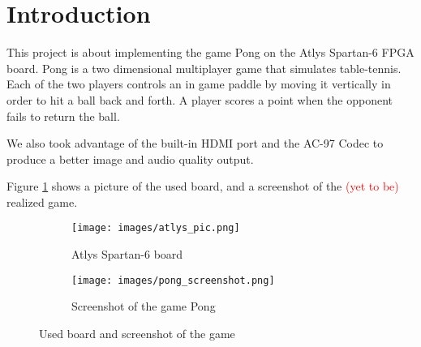 
\section{Introduction}
	This project is about implementing the game Pong on the Atlys Spartan-6 FPGA board. Pong is a two dimensional multiplayer game that simulates table-tennis. Each of the two players controls an in game paddle by moving it vertically in order to hit a ball back and forth. A player scores a point when the opponent fails to return the ball. 
	
	We also took advantage of the built-in HDMI port and the AC-97 Codec to produce a better image and audio quality output. 
	
	Figure \ref{board+screenshot} shows a picture of the used board, and a screenshot of the \textcolor{red}{(yet to be)} realized game. 
	
	\begin{figure}[h]
		\begin{subfigure}[b]{.4\textwidth}
			\texttt{[image: images/atlys\_pic.png]}
			\caption{Atlys Spartan-6 board}
		\end{subfigure}
		\hfill
		\begin{subfigure}[b]{.4\textwidth}
			\texttt{[image: images/pong\_screenshot.png]}		
			\caption{Screenshot of the game Pong}
		\end{subfigure}
		
	\caption{Used board and screenshot of the game}
	\label{board+screenshot}
	\end{figure}
	

